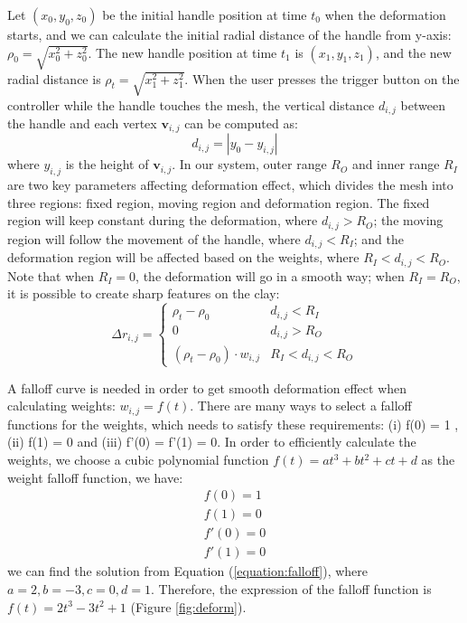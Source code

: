 \documentclass{svjour3}                     %
\begin{document}
Let $(x_{0},y_{0},z_{0})$ be the initial handle position at time $t_{0}$ when the deformation starts, and we can calculate the initial radial distance of the handle from y-axis: $\rho_{0} = \sqrt{x_{0}^2 + z_{0}^2}$. The new handle position at time $t_{1}$ is $(x_{1},y_{1},z_{1})$, and the new radial distance is $\rho_{t} = \sqrt{x_{1}^2 + z_{1}^2}$.
When the user presses the trigger button on the controller while the handle touches the mesh, the vertical distance $d_{i,j}$ between the handle and each vertex $\mathbf{v}_{i,j}$ can be computed as:
\begin{equation}
d_{i,j} = |y_{0} - y_{i,j}|
\end{equation}
where $y_{i,j}$ is the height of $\mathbf{v}_{i,j}$.
In our system, outer range $R_{O}$ and inner range $R_{I}$ are two key parameters affecting deformation effect, which divides the mesh into three regions: fixed region, moving region and  deformation region.
The fixed region will keep constant during the deformation, where $d_{i,j} > R_{O}$; the moving region will follow the movement of the handle, where $d_{i,j} < R_{I}$; and the deformation region will be affected based on the weights, where $R_{I} < d_{i,j} < R_{O}$.
Note that when $R_{I} = 0$, the deformation will go in a smooth way; when $R_{I} = R_{O}$, it is possible to create sharp features on the clay:
\begin{equation}
\Delta r_{i,j} = \begin{cases}
\rho_{t} - \rho_{0} &  d_{i,j} < R_{I} \\
0 &  d_{i,j} > R_{O} \\
(\rho_{t} - \rho_{0}) \cdot w_{i,j} &  R_{I} < d_{i,j} < R_{O}
\end{cases}
\end{equation}

A falloff curve is needed in order to get smooth deformation effect when calculating weights: $w_{i,j} = f(t)$.
There are many ways to select a falloff functions for the weights, which needs to satisfy these requirements: (i) f(0) = 1 , (ii) f(1) = 0 and (iii) f'(0) = f'(1) = 0.
In order to efficiently calculate the weights, we choose a cubic polynomial function $f(t) = at^3 + bt^2 + ct + d$ as the weight falloff function, we have:
\begin{equation}
\begin{aligned}
\label{equation:falloff}
f(0) = 1 \\
f(1) = 0 \\ 
f'(0) = 0 \\
f'(1) = 0
\end{aligned}
\end{equation}
we can find the solution from Equation (\ref{equation:falloff}), where 
$a = 2, b = -3, c = 0, d = 1$. Therefore, the expression of the falloff function is $f(t) = 2t^3 - 3t^2 + 1$ (Figure \ref{fig:deform}).
\end{document}

